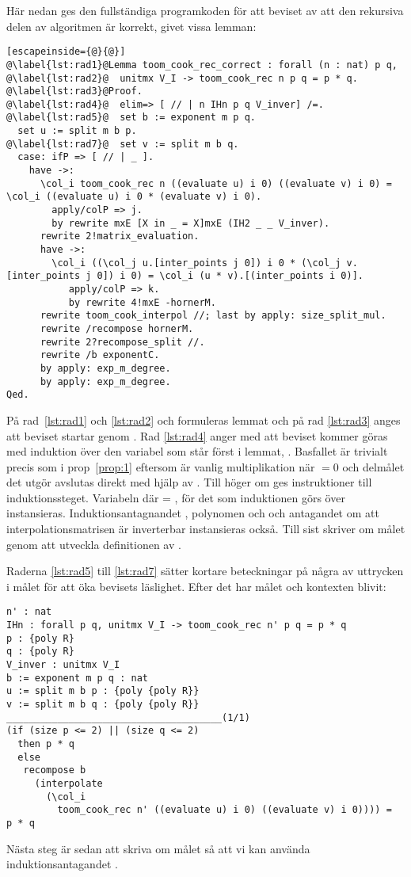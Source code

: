 Här nedan ges den fullständiga programkoden för att beviset av att den
rekursiva delen av algoritmen är korrekt, givet vissa lemman:
\lstset{numbers=left}
\begin{lstlisting}[escapeinside={@}{@}]
@\label{lst:rad1}@Lemma toom_cook_rec_correct : forall (n : nat) p q,
@\label{lst:rad2}@  unitmx V_I -> toom_cook_rec n p q = p * q.
@\label{lst:rad3}@Proof.
@\label{lst:rad4}@  elim=> [ // | n IHn p q V_inver] /=.
@\label{lst:rad5}@  set b := exponent m p q.
  set u := split m b p.
@\label{lst:rad7}@  set v := split m b q.
  case: ifP => [ // | _ ].
    have ->:
      \col_i toom_cook_rec n ((evaluate u) i 0) ((evaluate v) i 0) = \col_i ((evaluate u) i 0 * (evaluate v) i 0).
        apply/colP => j.
        by rewrite mxE [X in _ = X]mxE (IH2 _ _ V_inver).
      rewrite 2!matrix_evaluation.
      have ->:
        \col_i ((\col_j u.[inter_points j 0]) i 0 * (\col_j v.[inter_points j 0]) i 0) = \col_i (u * v).[(inter_points i 0)].
           apply/colP => k.
           by rewrite 4!mxE -hornerM.
      rewrite toom_cook_interpol //; last by apply: size_split_mul.
      rewrite /recompose hornerM.
      rewrite 2?recompose_split //.
      rewrite /b exponentC.
      by apply: exp_m_degree.
      by apply: exp_m_degree.
Qed.
\end{lstlisting}
\lstset{numbers=none}
På rad~\ref{lst:rad1} och \ref{lst:rad2} och formuleras lemmat och på rad
\ref{lst:rad3} anges att beviset startar genom . Rad \ref{lst:rad4}
anger med  att beviset kommer göras med induktion över den variabel
som står först i lemmat, . Basfallet är trivialt precis som i
prop~\ref{prop:1} eftersom  är vanlig multiplikation när
$=0$ och delmålet det utgör avslutas direkt med hjälp av \C{//}. Till
höger om \C{|} ges instruktioner till induktionssteget. Variabeln  där
  = , för det  som induktionen görs över instansieras.
Induktionsantagnandet , polynomen  och  och antagandet
 om att interpolationsmatrisen är inverterbar instansieras också.
Till sist skriver \C{/=} om målet genom att utveckla definitionen av
.

Raderna \ref{lst:rad5} till \ref{lst:rad7} sätter kortare beteckningar på några
av uttrycken i målet för att öka bevisets läslighet. Efter det har målet och
kontexten blivit:
\begin{lstlisting}
n' : nat
IHn : forall p q, unitmx V_I -> toom_cook_rec n' p q = p * q
p : {poly R}
q : {poly R}
V_inver : unitmx V_I
b := exponent m p q : nat
u := split m b p : {poly {poly R}}
v := split m b q : {poly {poly R}}
______________________________________(1/1)
(if (size p <= 2) || (size q <= 2)
  then p * q
  else
   recompose b
     (interpolate
       (\col_i
         toom_cook_rec n' ((evaluate u) i 0) ((evaluate v) i 0)))) =
p * q
\end{lstlisting}
Nästa steg är sedan att skriva om målet så att vi kan använda
induktionsantagandet .

